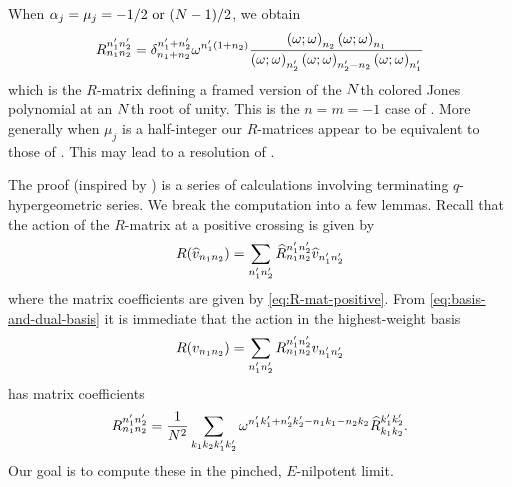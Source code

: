 \documentclass{sl2ams}
\numberwithin{equation}{section}
\begin{document}
\begin{remark}
  When \(\alpha_j = \mu_j = -1/2 \text{ or } (N - 1)/2\), we obtain
  \begin{equation}
    \label{eq:colored-Jones-R-matrix}
    R_{n_1 n_2}^{n_1' n_2'}
    =
    \del{n_1 + n_2}{n_1' +  n_2'}
    \omega^{n_1'(1 + n_2)}
    \frac{
      \qp{\omega}{n_2}
      \qp{\omega}{n_1}
      }{
      \qp{\omega}{n_2'}
      \qp{\omega}{n_2' - n_2}
      \qp{\omega}{n_1'}
    }
  \end{equation}
  which is the \(R\)-matrix defining a framed version of the \(N\)th colored Jones polynomial at an \(N\)th root of unity.
  This is the \(n = m = -1\) case of \cite[eq.\@ 43]{Garoufalidis2021descendant}.
  More generally when \(\mu_j\) is a half-integer our \(R\)-matrices appear to be equivalent to those of \cite[eq.\@ 43]{Garoufalidis2021descendant}.
  This may lead to a resolution of \cite[Conjecture 3.2]{Garoufalidis2021descendant}.
\end{remark}

The proof (inspired by \cite[Section 3.2]{Garoufalidis2021descendant}) is a series of calculations involving terminating \(q\)-hypergeometric series.
We break the computation into a few lemmas.
Recall that the action of the \(R\)-matrix at a positive crossing is given by
\[
  R(\widehat{v}_{n_1 n_2})
  =
  \sum_{n_1' n_2'}
  \widehat R_{n_1 n_2}^{n_1' n_2'}
  \widehat{v}_{n_1' n_2'}
\]
where the matrix coefficients are given by \cref{eq:R-mat-positive}.
From \eqref{eq:basis-and-dual-basis} it is immediate that the action in the highest-weight basis
\[
  R(v_{n_1 n_2})
  =
  \sum_{n_1' n_2'}
  R_{n_1 n_2}^{n_1' n_2'}
  v_{n_1' n_2'}
\]
has matrix coefficients
\begin{equation}
  \label{eq:fourier-dual-coefficients-definition}
  R_{n_1 n_2}^{n_1' n_2'}
  =
  \frac{1}{\nr^2}
  \sum_{k_1 k_2 k_1' k_2'}
  \omega^{n_1' k_1' + n_2' k_2' - n_1 k_1 - n_2 k_2}
  \rmat{k_1}{k_2}{k_1'}{k_2'}
  .
\end{equation}
Our goal is to compute these in the pinched, \(E\)-nilpotent limit.
\end{document}
